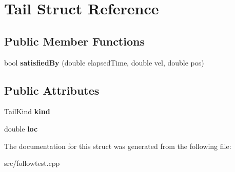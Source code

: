 \hypertarget{structTail}{}\section{Tail Struct Reference}
\label{structTail}
\subsection*{Public Member Functions}
\begin{DoxyCompactItemize}
\item 
\mbox{\label{structTail_a44f3d1d2a4273e2c5c15e1c98a2c4117}} 
bool {\bfseries satisfied\+By} (double elapsed\+Time, double vel, double pos)
\end{DoxyCompactItemize}
\subsection*{Public Attributes}
\begin{DoxyCompactItemize}
\item 
\mbox{\label{structTail_a621f8106a7ff97bd5f416a9ceaead368}} 
Tail\+Kind {\bfseries kind}
\item 
\mbox{\label{structTail_a61c5a1fd4a82cb3c072ba979a84dc5b4}} 
double {\bfseries loc}
\end{DoxyCompactItemize}


The documentation for this struct was generated from the following file\+:\begin{DoxyCompactItemize}
\item 
src/followtest.\+cpp\end{DoxyCompactItemize}
